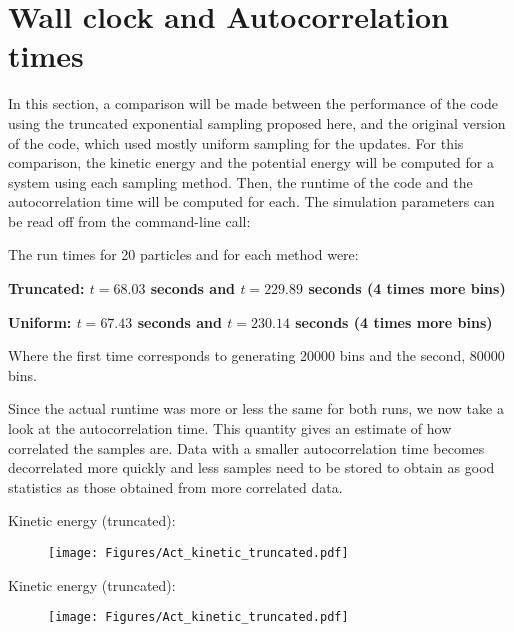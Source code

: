 \documentclass[12pt, two sided]{article}
\begin{document}

\section{Wall clock and Autocorrelation times}

In this section, a comparison will be made between the performance of the code using the truncated exponential sampling proposed here, and the original version of the code, which used mostly uniform sampling for the updates. For this comparison, the kinetic energy and the potential energy will be computed for a system using each sampling method. Then, the runtime of the code and the autocorrelation time will be computed for each. The simulation parameters can be read off from the command-line call:


The run times for 20 particles and for each method were:

\textbf{Truncated: $t = 68.03$ seconds and $t = 229.89$ seconds (4 times more bins)}

\textbf{Uniform: $t = 67.43$ seconds and $t = 230.14$ seconds (4 times more bins)}

Where the first time corresponds to generating 20000 bins and the second, 80000 bins.

Since the actual runtime was more or less the same for both runs, we now take a look at the autocorrelation time. This quantity gives an estimate of how correlated the samples are. Data with a smaller autocorrelation time becomes decorrelated more quickly and less samples need to be stored to obtain as good statistics as those obtained from more correlated data.

Kinetic energy (truncated):

\begin{figure}[h!]
\texttt{[image: Figures/Act\_kinetic\_truncated.pdf]}
\end{figure}

Kinetic energy (truncated):

\begin{figure}[h!]
\texttt{[image: Figures/Act\_kinetic\_truncated.pdf]}
\end{figure}
\end{document}
